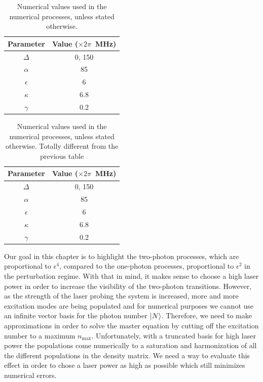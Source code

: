 \begin{table} \begin{center}
        \caption{Numerical values of the model. }
        \caption*{Numerical values used in the numerical processes, unless stated otherwise. }
        \begin{tabular}{c|c}
            Parameter    & Value ($\times 2 \pi$~MHz) \\ \hline \hline
            $\Delta$     & 0, 150                     \\
            ${\alpha}$   & 85                         \\
            ${\epsilon}$ & 6                          \\
            ${\kappa}$   & 6.8                        \\
            ${\gamma}$   & 0.2
        \end{tabular}
        \label{tab-values}
    \end{center}\end{table}


\begin{table} \begin{center}
        \caption{Other numerical values of the model. }
        \caption*{Numerical values used in the numerical processes, unless stated otherwise. Totally different from the previous table}
        \begin{tabular}{c|c}
            Parameter    & Value ($\times 2 \pi$~MHz) \\ \hline \hline
            $\Delta$     & 0, 150                     \\
            ${\alpha}$   & 85                         \\
            ${\epsilon}$ & 6                          \\
            ${\kappa}$   & 6.8                        \\
            ${\gamma}$   & 0.2
        \end{tabular}
        \label{tab-values2}
    \end{center}\end{table}

Our goal in this chapter is to highlight the two-photon processes, which are proportional to $\epsilon^4$, compared to the one-photon processes, proportional to $\epsilon^2$ in the perturbation regime. With that in mind, it makes sense to choose a high laser power in order to increase the visibility of the two-photon transitions. However, as the strength of the laser probing the system is increased, more and more excitation modes are being populated and for numerical purposes we cannot use an infinite vector basis for the photon number $| N \rangle$. Therefore, we need to make approximations in order to solve the master equation by cutting off the excitation number to a maximum $n_{\mbox{max}}$. Unfortunately, with a truncated basis for high laser power the populations come numerically to a saturation and harmonization of all the different populations in the density matrix. We need a way to evaluate this effect in order to chose a laser power as high as possible which still minimizes numerical errors.

